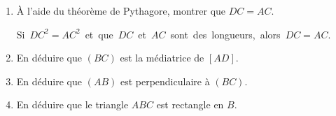\begin{activite}
    \begin{minipage}{0.3\linewidth}
    \end{minipage}
    \begin{minipage}{0.7\linewidth}        
        \begin{enumerate}
            \item À l'aide du théorème de Pythagore, montrer que $DC=AC$.
            
             \mbox{Si $DC^2=AC^2$ et que $DC$ et $AC$ sont des longueurs, alors $DC=AC$.}
            \item En déduire que $(BC)$ est la médiatrice de $[AD]$.
            \item En déduire que $(AB)$ est perpendiculaire à $(BC)$.
            \item En déduire que le triangle $ABC$ est rectangle en $B$.
        \end{enumerate}
    \end{minipage}
\end{activite}